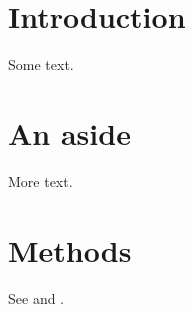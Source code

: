 \section{Introduction}\flmLabels{\label{ref1}}

Some text.

\section*{An aside}

More text.

\section{Methods}\flmLabels{\label{ref2}}

See  and .%
